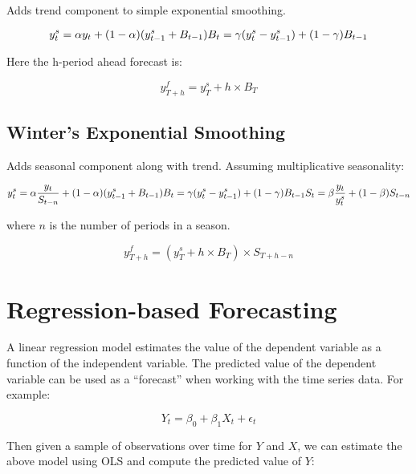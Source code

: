 \documentclass[]{book}
\theoremstyle{definition}
\theoremstyle{definition}
\theoremstyle{definition}
\theoremstyle{remark}
\begin{document}
Adds trend component to simple exponential smoothing.

\begin{equation}
    y_{t}^{s}= \alpha y_t + (1-\alpha)(y_{t-1}^{s}+B_{t-1})\\
    B_t = \gamma (y_t^s -y_{t-1}^s) + (1-\gamma) B_{t-1}
 \end{equation}

Here the h-period ahead forecast is:

\begin{equation}
    y^f_{T+h} = y_T^s + h\times B_T
  \end{equation}

\subsection{Winter's Exponential
Smoothing}\label{winters-exponential-smoothing}

Adds seasonal component along with trend. Assuming multiplicative
seasonality:

\begin{equation}
    y_{t}^{s}= \alpha \frac{y_t}{S_{t-n}} + (1-\alpha)(y_{t-1}^{s}+B_{t-1})\\
    B_t = \gamma (y_t^s -y_{t-1}^s) + (1-\gamma) B_{t-1}\\
    S_t = \beta\frac{y_t}{y_t^s}+(1-\beta)S_{t-n}
  \end{equation}

\noindent where \(n\) is the number of periods in a season.

\begin{equation}
    y^f_{T+h} = (y_T^s + h\times B_T) \times S_{T+h-n}
   \end{equation}

\section{Regression-based
Forecasting}\label{regression-based-forecasting}

A linear regression model estimates the value of the dependent variable
as a function of the independent variable. The predicted value of the
dependent variable can be used as a ``forecast'' when working with the
time series data. For example:

\begin{equation}
    Y_t = \beta_0 +\beta_1 X_t + \epsilon_t
    \end{equation}

Then given a sample of observations over time for \(Y\) and \(X\), we
can estimate the above model using OLS and compute the predicted value
of \(Y\):
\end{document}
